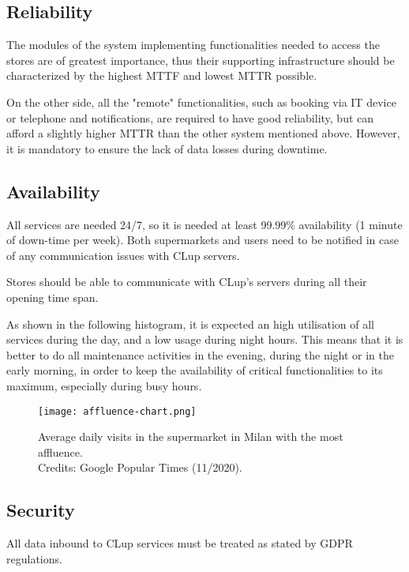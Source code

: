 \documentclass[../../main.tex]{subfiles}
\begin{document}
	\subsection{Reliability}

	The modules of the system implementing functionalities needed to access the stores are of greatest importance, thus their supporting 
	infrastructure should be characterized by the highest MTTF and lowest MTTR possible.

	On the other side, all the "remote" functionalities, such as booking via IT device or telephone and notifications, 
	are required to have good reliability, but can afford a slightly higher MTTR than the other system mentioned above. 
	However, it is mandatory to ensure the lack of data losses during downtime.

	\subsection{Availability}

	All services are needed 24/7, so it is needed at least 99.99\% availability (1 minute of down-time per week). 
	Both supermarkets and users need to be notified in case of any communication issues with CLup servers.

	Stores should be able to communicate with CLup's servers during all their opening time span.

	As shown in the following histogram, it is expected an high utilisation of all services during the day, 
	and a low usage during night hours. This means that it is better to do all maintenance activities in the evening, 
	during the night or in the early morning, in order to keep the availability of critical functionalities to its maximum, 
	especially during busy hours.

	\begin{figure}[H]
	    \centering
	    \texttt{[image: affluence-chart.png]}
	    \caption{Average daily visits in the supermarket in Milan with the most affluence. \\Credits: Google Popular Times (11/2020).}
  	\end{figure}

	\subsection{Security}

	All data inbound to CLup services must be treated as stated by GDPR regulations. 
\end{document}
